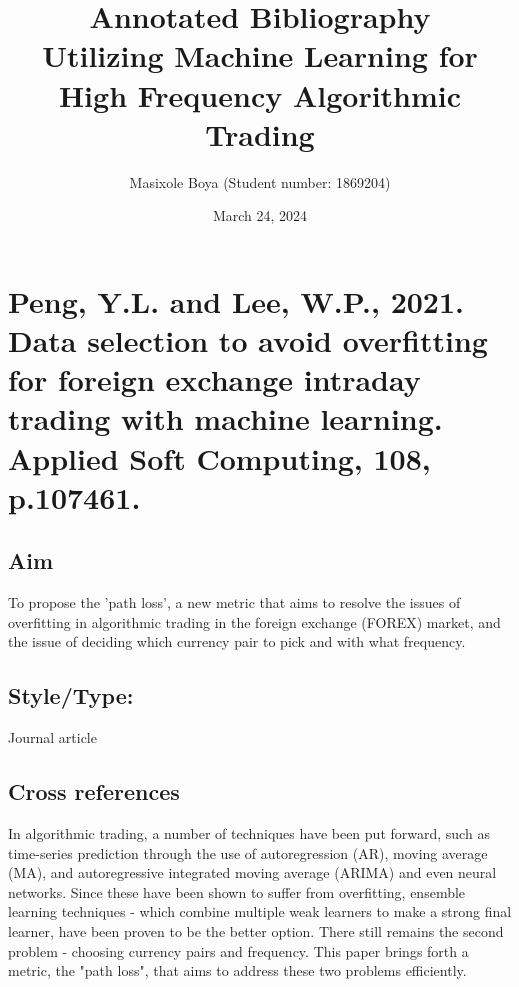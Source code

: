 \documentclass{article}
\begin{document}
\title{Annotated Bibliography \\ Utilizing Machine Learning for High Frequency Algorithmic Trading}
\author{Masixole Boya (Student number: 1869204)}
\date{March 24, 2024}
\maketitle



\section{Peng, Y.L. and Lee, W.P., 2021. Data selection to avoid overfitting for foreign exchange intraday trading with machine learning. Applied Soft Computing, 108, p.107461.}
    \justify
    \subsection*{Aim}
    To propose the 'path loss', a new metric that aims to resolve the issues of overfitting in algorithmic trading in the foreign exchange (FOREX) market, and the issue of deciding which currency pair to pick and with what frequency.
    
    
    \subsection*{Style/Type:}Journal article\\
    
    \subsection*{Cross references}
    In algorithmic trading, a number of techniques have been put forward, such as time-series prediction through the use of autoregression (AR), moving average (MA), and autoregressive integrated moving average (ARIMA) and even neural networks. Since these have been shown to suffer from overfitting, ensemble learning techniques - which combine multiple weak learners to make a strong final learner, have been proven to be the better option. There still remains the second problem - choosing currency pairs and frequency. This paper brings forth a metric, the "path loss", that aims to address these two problems efficiently.
    
\end{document}
